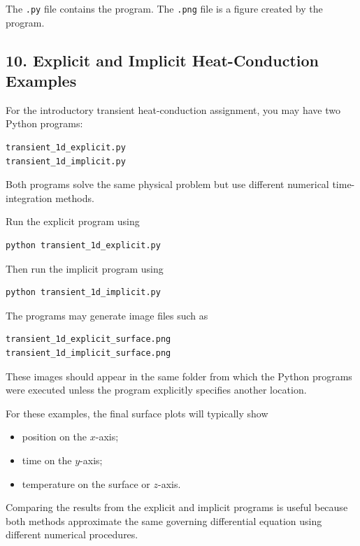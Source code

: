 \documentclass[11pt]{article}
\begin{document}
The \texttt{.py} file contains the program. The \texttt{.png} file is a
figure created by the program.

\subsection*{10. Explicit and Implicit Heat-Conduction Examples}

For the introductory transient heat-conduction assignment, you may have
two Python programs:

\begin{lstlisting}
transient_1d_explicit.py
transient_1d_implicit.py
\end{lstlisting}

Both programs solve the same physical problem but use different
numerical time-integration methods.

Run the explicit program using

\begin{lstlisting}
python transient_1d_explicit.py
\end{lstlisting}

Then run the implicit program using

\begin{lstlisting}
python transient_1d_implicit.py
\end{lstlisting}

The programs may generate image files such as

\begin{lstlisting}
transient_1d_explicit_surface.png
transient_1d_implicit_surface.png
\end{lstlisting}

These images should appear in the same folder from which the Python
programs were executed unless the program explicitly specifies another
location.

For these examples, the final surface plots will typically show

\begin{itemize}
    \item position on the $x$-axis;
    \item time on the $y$-axis;
    \item temperature on the surface or $z$-axis.
\end{itemize}

Comparing the results from the explicit and implicit programs is useful
because both methods approximate the same governing differential
equation using different numerical procedures.
\end{document}
